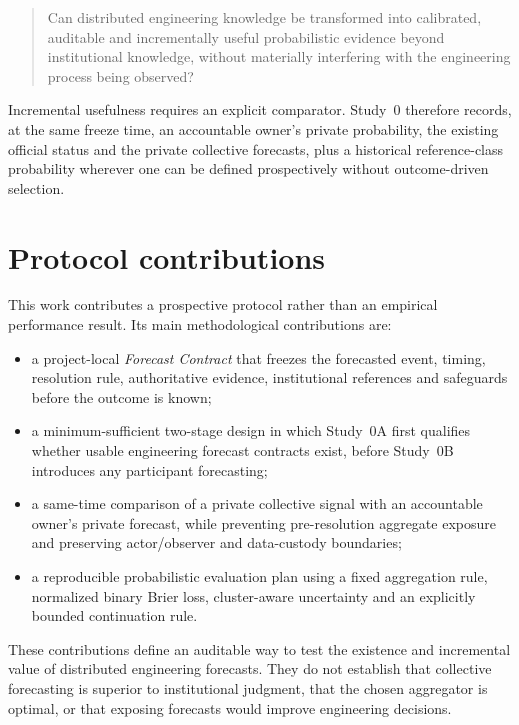 \begin{quote}
Can distributed engineering knowledge be transformed into calibrated, auditable and incrementally useful probabilistic evidence beyond institutional knowledge, without materially interfering with the engineering process being observed?
\end{quote}

Incremental usefulness requires an explicit comparator. Study~0 therefore records, at the same freeze time, an accountable owner's private probability, the existing official status and the private collective forecasts, plus a historical reference-class probability wherever one can be defined prospectively without outcome-driven selection.

\section{Protocol contributions}
This work contributes a prospective protocol rather than an empirical performance result. Its main methodological contributions are:

\begin{itemize}
  \item a project-local \emph{Forecast Contract} that freezes the forecasted event, timing, resolution rule, authoritative evidence, institutional references and safeguards before the outcome is known;
  \item a minimum-sufficient two-stage design in which Study~0A first qualifies whether usable engineering forecast contracts exist, before Study~0B introduces any participant forecasting;
  \item a same-time comparison of a private collective signal with an accountable owner's private forecast, while preventing pre-resolution aggregate exposure and preserving actor/observer and data-custody boundaries;
  \item a reproducible probabilistic evaluation plan using a fixed aggregation rule, normalized binary Brier loss, cluster-aware uncertainty and an explicitly bounded continuation rule.
\end{itemize}

These contributions define an auditable way to test the existence and incremental value of distributed engineering forecasts. They do not establish that collective forecasting is superior to institutional judgment, that the chosen aggregator is optimal, or that exposing forecasts would improve engineering decisions.

